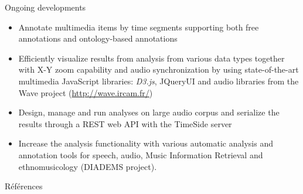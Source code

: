 \documentclass[final, hyperref, table]{beamer}
\begin{document}
\begin{frame}[containsverbatim]{}
\begin{columns}[T]
\begin{column}[T]{.49\linewidth}

  \begin{block}{Ongoing developments}
\vspace{-1cm}
    \begin{multicols}{2}[]
        \begin{itemize}
        \item \alert{Annotate} multimedia items by time segments supporting both free annotations and ontology-based annotations
        \item Efficiently \alert{visualize} results from analysis from various data types together with X-Y zoom capability and audio synchronization by using state-of-the-art multimedia JavaScript libraries: \emph{D3.js}, JQueryUI and audio libraries from the Wave project (\url{http://wave.ircam.fr/})
        \item Design, manage and run analyses on large audio corpus and serialize the results through a REST web API with the TimeSide server
        \item Increase the analysis functionality with various automatic analysis and annotation tools for speech, audio, Music Information Retrieval and ethnomusicology (DIADEMS project).

\end{itemize}
\end{multicols}
\end{block}

\begin{block}{Références}\tiny

\vspace{-1cm}
\begin{multicols}{2}[]

\end{multicols}
\end{block}
  
\end{column}
\end{columns}
\end{frame}
\end{document}
